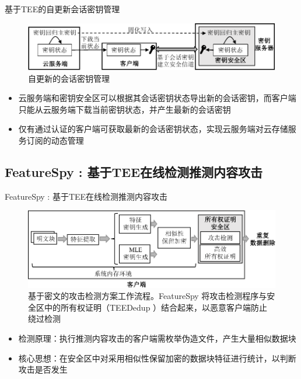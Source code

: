 \documentclass{beamer}
\newcommand{\sysnameS}{TEEDedup }
\newcommand{\sysnameF}{FeatureSpy }
\begin{document}
\begin{frame}{基于TEE的自更新会话密钥管理}
    \begin{figure}[!htb]
        \centering
        \includegraphics[width=\textwidth]{../pic/sgxdedup/keyRegression.pdf}
        \caption{自更新的会话密钥管理}
        \label{fig:sgxdedup-keymanage}
    \end{figure}
    \vspace{-1em}
    \begin{itemize}
        \item 云服务端和密钥安全区可以根据其会话密钥状态导出新的会话密钥，而客户端只能从云服务端下载当前密钥状态，并产生最新的会话密钥
        \item 仅有通过认证的客户端可获取最新的会话密钥状态，实现云服务端对云存储服务订阅的动态管理
    \end{itemize}
\end{frame}

\subsection{\sysnameF: 基于TEE在线检测推测内容攻击}

\begin{frame}{\sysnameF: 基于TEE在线检测推测内容攻击}
    \begin{figure}[!htb]
        \centering
        \includegraphics[width=\textwidth]{../pic/featurespy/architecture.pdf}
        \caption{基于密文的攻击检测方案工作流程。\sysnameF 将攻击检测程序与安全区中的所有权证明（\sysnameS ）结合起来，以恶意客户端防止绕过检测}
        \label{fig:featurespy-architecture-secure}
    \end{figure}
    \vspace{-1em}
    \begin{itemize}
        \item 检测原理：执行推测内容攻击的客户端需枚举伪造文件，产生大量相似数据块
        \item 核心思想：在安全区中对采用相似性保留加密的数据块特征进行统计，以判断攻击是否发生
    \end{itemize}
\end{frame}
\end{document}
